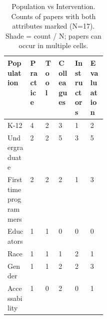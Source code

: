 \begin{table}[!htbp]
\centering
\small
\setlength{\tabcolsep}{4pt}
\renewcommand{\arraystretch}{1.3}
\caption{Population vs Intervention. Counts of papers with both attributes marked (N=17). Shade = count / N; papers can occur in multiple cells.}
\begin{tabularx}{\linewidth}{|>{\raggedright\arraybackslash}p{0.23\linewidth}|>{\centering\arraybackslash}X|>{\centering\arraybackslash}X|>{\centering\arraybackslash}X|>{\centering\arraybackslash}X|>{\centering\arraybackslash}X|}
\hline
\textbf{Population} & \textbf{\hspace{0pt}Practice} & \textbf{\hspace{0pt}Tool} & \textbf{\hspace{0pt}Colleagues} & \textbf{\hspace{0pt}Instructors} & \textbf{\hspace{0pt}Evaluation} \\ \hline
K-12 & \cellcolor{purple!24}4 & \cellcolor{purple!12}2 & \cellcolor{purple!18}3 & \cellcolor{purple!6}1 & \cellcolor{purple!12}2 \\ \hline
Undergraduate & \cellcolor{purple!12}2 & \cellcolor{purple!12}2 & \cellcolor{purple!29}5 & \cellcolor{purple!18}3 & \cellcolor{purple!29}5 \\ \hline
First time programmers & \cellcolor{purple!12}2 & \cellcolor{purple!12}2 & \cellcolor{purple!12}2 & \cellcolor{purple!6}1 & \cellcolor{purple!18}3 \\ \hline
Educators & \cellcolor{purple!6}1 & \cellcolor{purple!6}1 & \cellcolor{purple!0}0 & \cellcolor{purple!0}0 & \cellcolor{purple!0}0 \\ \hline
Race & \cellcolor{purple!6}1 & \cellcolor{purple!6}1 & \cellcolor{purple!6}1 & \cellcolor{purple!12}2 & \cellcolor{purple!6}1 \\ \hline
Gender & \cellcolor{purple!6}1 & \cellcolor{purple!6}1 & \cellcolor{purple!12}2 & \cellcolor{purple!12}2 & \cellcolor{purple!18}3 \\ \hline
Accessability & \cellcolor{purple!6}1 & \cellcolor{purple!0}0 & \cellcolor{purple!12}2 & \cellcolor{purple!0}0 & \cellcolor{purple!6}1 \\ \hline
\end{tabularx}
\end{table}
